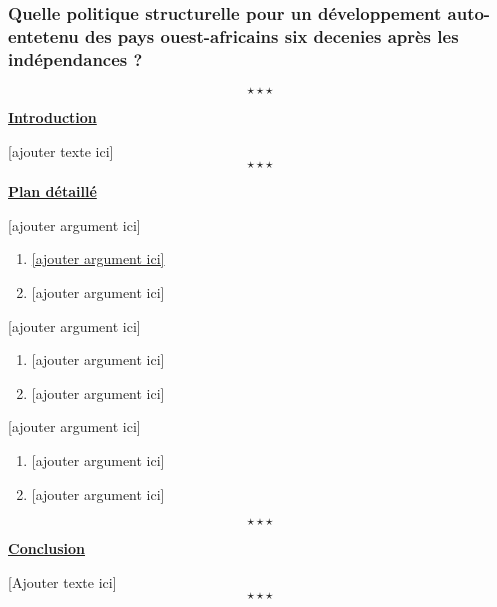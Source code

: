 \newpage \begin{center}
	\subsubsection*{Quelle politique structurelle pour un développement auto-entetenu des pays ouest-africains six decenies après les indépendances ?}
\end{center}
$$\star \star \star$$


%

\begin{center}
	\textbf{\underline{Introduction}} 
\end{center}

[ajouter texte ici] $$\star \star \star$$

\begin{center}
	{\bfseries \underline{Plan détaillé}}	
\end{center}
\begin{enumerate}[label*=\Alph*.]
	{\bfseries \item {[ajouter argument ici]}}
	\begin{enumerate}[label=\theenumi\arabic* -]
		\item \label{Arg-A.1-UAO-M1-S4}{\hyperref[Par-A.1-UAO-M1-S4]{[ajouter argument ici]}}
		\item {[ajouter argument ici]}  
	\end{enumerate}
	{\bfseries \item {[ajouter argument ici]}}
	\begin{enumerate}[label=\theenumi\arabic* -]
		\item {[ajouter argument ici]}
		\item {[ajouter argument ici]}  
	\end{enumerate}
	{\bfseries \item {[ajouter argument ici]}}
	\begin{enumerate}[label=\theenumi\arabic* -]
		\item {[ajouter argument ici]}
		\item {[ajouter argument ici]}  
	\end{enumerate}
\end{enumerate}
$$\star \star \star$$
\begin{center}
	\textbf{\underline{Conclusion}} 
\end{center} 

[Ajouter texte ici] $$\star \star \star$$